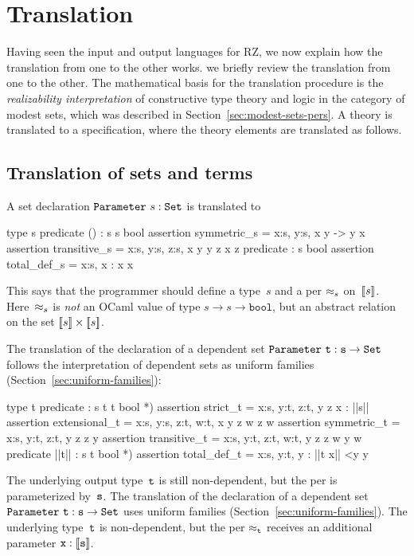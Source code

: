 \section{Translation}
\label{sec:translation}

Having seen the input and output languages for RZ,
%
\iflong
we now explain how the translation from one to the other works.
\else
we briefly review the translation from one to the other.
\fi
%
The mathematical basis for the translation procedure is the
\emph{realizability interpretation} of constructive type theory and
logic in the category of modest sets, which was described in
Section~\ref{sec:modest-sets-pers}. A theory is translated to a
specification, where the theory elements are translated as follows.



\subsection{Translation of sets and terms}
\label{sec:transl-sets-terms}

A set declaration $\mathtt{Parameter}\ s : \mathtt{Set}$ is translated to
%
\begin{source}
type s
predicate () : s \iTo s \iTo bool
assertion symmetric_s =  \iForall x:s, y:s, x  y -> y  x
assertion transitive_s = \iForall x:s, y:s, z:s, x  y \iAnd y  z \iTo x  z
predicate  : s \iTo bool
assertion total_def_s =  \iForall x:s,  x :  \iIff x  x
\end{source}
%
This says that the programmer should define a type~$s$ and a per
$\approx_s$ on~$[\![s]\!]$. Here~$\approx_s$ is \emph{not} an OCaml value
of type $s \to s \to \mathtt{bool}$, but an abstract relation on the
set $[\![s]\!] \times [\![s]\!]$.

\iflong
The translation of the declaration of a dependent set
$\mathtt{Parameter}\ \mathtt{t} : \mathtt{s} \to \mathtt{Set}$ follows the interpretation of dependent
sets as uniform families (Section~\ref{sec:uniform-families}):
%
\begin{source}
type t
predicate  : s \iTo t \iTo t \iTo bool *)
assertion strict_t =  \iForall x:s, y:t, z:t, y  z \iTo x : ||s||
assertion extensional_t =
  \iForall x:s, y:s, z:t, w:t, x  y \iTo z  w \iTo z  w
assertion symmetric_t = \iForall x:s, y:t, z:t, y  z \iTo z  y
assertion transitive_t =
  \iForall x:s, y:t, z:t, w:t, y  z \iAnd z  w \iTo y  w
predicate ||t|| : s \iTo t \iTo bool *)
assertion total_def_t =  \iForall x:s, y:t, y : ||t x|| <\iTo y  y
\end{source}
%
The underlying output type~$\mathtt{t}$ is still non-dependent, but the per is
parameterized by~$\mathtt{s}$.
\else %
The translation of the declaration of a dependent set
$\mathtt{Parameter}\ \mathtt{t} : \mathtt{s} \to \mathtt{Set}$ uses uniform families
(Section~\ref{sec:uniform-families}). The underlying type~$\mathtt{t}$ is
non-dependent, but the per $\approx_{\mathtt{t}}$ receives an additional
parameter $\mathtt{x} : [\![\mathtt{s}]\!]$.
\fi %

